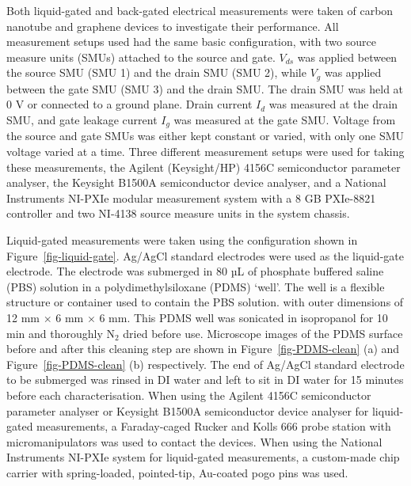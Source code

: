 \documentclass[
  a4paper,
]{scrbook}
\begin{document}
Both liquid-gated and back-gated electrical measurements were taken of
carbon nanotube and graphene devices to investigate their performance.
All measurement setups used had the same basic configuration, with two
source measure units (SMUs) attached to the source and gate. \(V_{ds}\)
was applied between the source SMU (SMU 1) and the drain SMU (SMU 2),
while \(V_{g}\) was applied between the gate SMU (SMU 3) and the drain
SMU. The drain SMU was held at 0 V or connected to a ground plane. Drain
current \(I_{d}\) was measured at the drain SMU, and gate leakage
current \(I_{g}\) was measured at the gate SMU. Voltage from the source
and gate SMUs was either kept constant or varied, with only one SMU
voltage varied at a time. Three different measurement setups were used
for taking these measurements, the Agilent (Keysight/HP) 4156C
semiconductor parameter analyser, the Keysight B1500A semiconductor
device analyser, and a National Instruments NI-PXIe modular measurement
system with a 8 GB PXIe-8821 controller and two NI-4138 source measure
units in the system chassis.

Liquid-gated measurements were taken using the configuration shown in
Figure~\ref{fig-liquid-gate}. Ag/AgCl standard electrodes were used as
the liquid-gate electrode. The electrode was submerged in 80 µL of
phosphate buffered saline (PBS) solution in a polydimethylsiloxane
(PDMS) `well'. The well is a flexible structure or container used to
contain the PBS solution. with outer dimensions of 12 mm \(\times\) 6 mm
\(\times\) 6 mm. This PDMS well was sonicated in isopropanol for 10 min
and thoroughly N\(_2\) dried before use. Microscope images of the PDMS
surface before and after this cleaning step are shown in
Figure~\ref{fig-PDMS-clean} (a) and Figure~\ref{fig-PDMS-clean} (b)
respectively. The end of Ag/AgCl standard electrode to be submerged was
rinsed in DI water and left to sit in DI water for 15 minutes before
each characterisation. When using the Agilent 4156C semiconductor
parameter analyser or Keysight B1500A semiconductor device analyser for
liquid-gated measurements, a Faraday-caged Rucker and Kolls 666 probe
station with micromanipulators was used to contact the devices. When
using the National Instruments NI-PXIe system for liquid-gated
measurements, a custom-made chip carrier with spring-loaded,
pointed-tip, Au-coated pogo pins was used.
\end{document}
